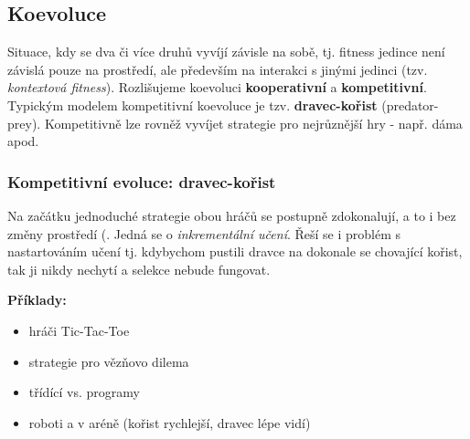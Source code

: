 \subsection{Koevoluce}
Situace, kdy se dva či více druhů vyvíjí závisle na sobě, tj. fitness jedince není závislá pouze na prostředí, ale především na interakci s jinými jedinci (tzv. \textit{kontextová fitness}). Rozlišujeme koevoluci \textbf{kooperativní} a \textbf{kompetitivní}. Typickým modelem kompetitivní koevoluce je tzv. \textbf{dravec-kořist} (predator-prey). Kompetitivně lze rovněž vyvíjet strategie pro nejrůznější hry - např. dáma apod.

\subsubsection{Kompetitivní evoluce: dravec-kořist}
Na začátku jednoduché strategie obou hráčů se postupně zdokonalují, a to i bez změny prostředí (. Jedná se o \textit{inkrementální učení}. Řeší se i problém s nastartováním učení tj. kdybychom pustili dravce na dokonale se chovající kořist, tak ji nikdy nechytí a selekce nebude fungovat.

\textbf{Příklady: }
\begin{itemize}
\item hráči Tic-Tac-Toe
\item strategie pro vězňovo dilema
\item třídící vs.  programy
\item roboti  a  v aréně (kořist rychlejší, dravec lépe vidí)
\end{itemize}

